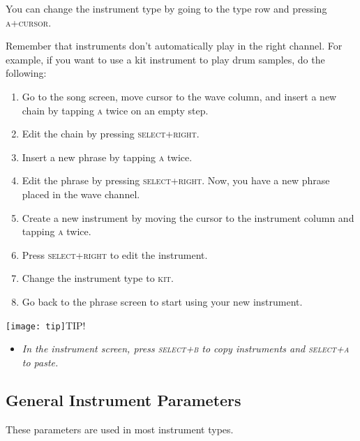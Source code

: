You can change the instrument type by going to the type row and pressing \textsc{a+cursor}.

Remember that instruments don't automatically play in the right channel. For example, if you want to use a kit instrument to play drum samples, do the following:

\begin{enumerate}
\item Go to the song screen, move cursor to the wave column, and insert a new chain by tapping \textsc{a} twice on an empty step.
\item	Edit the chain by pressing \textsc{select+right}.
\item	Insert a new phrase by tapping \textsc{a} twice.
\item	Edit the phrase by pressing \textsc{select+right}. Now, you have a new phrase placed in the wave channel.
\item	Create a new instrument by moving the cursor to the instrument column and tapping \textsc{a} twice.
\item	Press \textsc{select+right} to edit the instrument.
\item	Change the instrument type to \textsc{kit}.
\item	Go back to the phrase screen to start using your new instrument.
\end{enumerate}

\texttt{[image: tip]}TIP!
\begin{itemize}
	\item \textit{In the instrument screen, press \textsc{select+b} to copy instruments and \textsc{select+a} to paste.}
\end{itemize}

\subsection{General Instrument Parameters}
\label{general-instrument-parameters}

These parameters are used in most instrument types.

